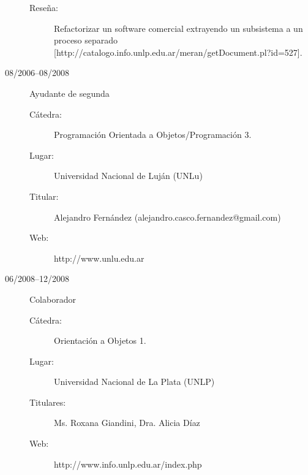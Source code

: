 \documentclass[a4paper]{article}
\begin{document}
\begin{description}
\begin{description}
	\item[Rese\~na: ] Refactorizar un software comercial extrayendo un subsistema a un proceso separado [http://catalogo.info.unlp.edu.ar/meran/getDocument.pl?id=527].
	\end{description}
\item[08/2006--08/2008] Ayudante de segunda
	\begin{description}
	\item[C{\'a}tedra: ] Programaci{\'o}n Orientada a Objetos/Programaci{\'o}n 3.
	\item[Lugar: ] Universidad Nacional de Luj{\'a}n (UNLu)
	\item[Titular: ] Alejandro Fern{\'a}ndez (alejandro.casco.fernandez@gmail.com)
    \item[Web: ] http://www.unlu.edu.ar
	\end{description}
\item[06/2008--12/2008] Colaborador
	\begin{description}
	\item[C{\'a}tedra: ] Orientaci{\'o}n a Objetos 1.
	\item[Lugar: ] Universidad Nacional de La Plata (UNLP)
	\item[Titulares: ] Ms. Roxana Giandini, Dra. Alicia D{\'i}az
    \item[Web: ] http://www.info.unlp.edu.ar/index.php
	\end{description}
\end{description}
\end{document}
